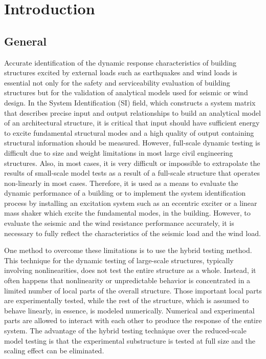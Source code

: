 \chapter{Introduction}
\label{chap:intro}
\section{General}
Accurate identification of the dynamic response characteristics of building structures excited by external loads such as earthquakes and wind loads is essential not only for the safety and serviceability evaluation of building structures but for the validation of analytical models used for seismic or wind design\citep{ljung1987system}. In the System Identification (SI) field, which constructs a system matrix that describes precise input and output relationships to build an analytical model of an architectural structure, it is critical that input should have sufficient energy to excite fundamental structural modes and a high quality of output containing structural information should be measured\citep{alvin1994second,madenci1994free}. However, full-scale dynamic testing is difficult due to size and weight limitations in most large civil engineering structures. Also, in most cases, it is very difficult or impossible to extrapolate the results of small-scale model tests as a result of a full-scale structure that operates non-linearly in most cases. Therefore, it is used as a means to evaluate the dynamic performance of a building or to implement the system identification process by installing an excitation system such as an eccentric exciter or a linear mass shaker which excite the fundamental modes, in the building. However, to evaluate the seismic and the wind resistance performance accurately, it is necessary to fully reflect the characteristics of the seismic load and the wind load.

One method to overcome these limitations is to use the hybrid testing method. This technique for the dynamic testing of large-scale structures, typically involving nonlinearities, does not test the entire structure as a whole. Instead, it often happens that nonlinearity or unpredictable behavior is concentrated in a limited number of local parts of the overall structure. Those important local parts are experimentally tested, while the rest of the structure, which is assumed to behave linearly, in essence, is modeled numerically. Numerical and experimental parts are allowed to interact with each other to produce the response of the entire system. The advantage of the hybrid testing technique over the reduced-scale model testing is that the experimental substructure is tested at full size and the scaling effect can be eliminated. 

